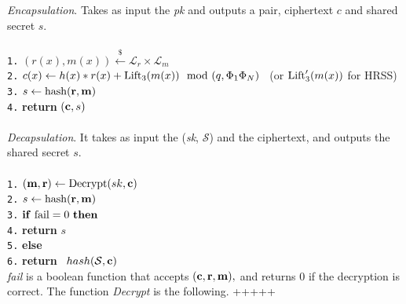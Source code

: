 \documentclass{amsart}
\numberwithin{equation}{section}
\begin{document}
{ {\it Encapsulation}. Takes as input the {\it{pk}} and outputs a pair, ciphertext $c$ and shared secret $s.$\\\\
\texttt{1.} $(r(x),m(x)) \xleftarrow{\$} {\mathcal{L}}_r\times {\mathcal{L}}_m$ \\
\texttt{2.} $ c(x) \leftarrow h(x)*r(x) + {\rm{Lift}_3}(m(x)) \mod{(q,\Phi_1\Phi_N)}$ \ (or ${\rm{Lift}'_3}(m(x))$ for HRSS)\\
\texttt{3.}  $s \leftarrow {\rm{hash}}({\bf r},{\bf m})$\\
\texttt{4.} {\bf return} $({\bf c},s)$\\\\
 {\it Decapsulation}. It takes as input the ({\it{sk}}, ${\mathcal{S}}$) and the ciphertext, and outputs the shared secret $s.$\\\\
 \texttt{1.}  $({\bf m},{\bf r}) \leftarrow {\rm{Decrypt}}(sk,{\bf c})$\\
 \texttt{2.}  $ s \leftarrow {\rm hash}({\bf r},{\bf m})$\\
\texttt{3.} ${\bf if} {\ \rm fail}=0\ {\bf then}$ \\
\texttt{4.} \hspace{10pt} {\bf return}  $s$ \\
\texttt{5.}  {\bf else}\ \\
\texttt{6.}  \hspace{10pt} {\bf return}  \ $hash({\mathcal{S}},{\bf c})$ \\
  
 {\it{fail}} is a boolean function that accepts $({\bf c},{\bf r},{\bf m}),$ and returns $0$ if the decryption is correct.
 The function {\it{Decrypt}} is the following.
 +++++
}
\end{document}
